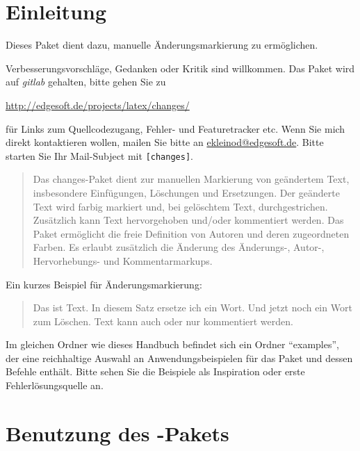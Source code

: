 \section{Einleitung}

Dieses Paket dient dazu, manuelle Änderungsmarkierung zu ermöglichen.

Verbesserungsvorschläge, Gedanken oder Kritik sind willkommen.
Das Paket wird auf \emph{gitlab} gehalten, bitte gehen Sie zu

\url{http://edgesoft.de/projects/latex/changes/}

für Links zum Quellcodezugang, Fehler- und Featuretracker etc.
Wenn Sie mich direkt kontaktieren wollen, mailen Sie bitte an \href{mailto:ekleinod@edgesoft.de}{ekleinod@edgesoft.de}.
Bitte starten Sie Ihr Mail-Subject mit \texttt{[changes]}.

\begin{quote}
	Das changes-Paket dient zur manuellen Markierung von geändertem Text, insbesondere Einfügungen, Löschungen und Ersetzungen.
	Der geänderte Text wird farbig markiert und, bei gelöschtem Text, durchgestrichen.
	Zusätzlich kann Text hervorgehoben und/oder kommentiert werden.
	Das Paket ermöglicht die freie Definition von Autoren und deren zugeordneten Farben.
	Es erlaubt zusätzlich die Änderung des Änderungs-, Autor-, Hervorhebungs- und Kommentarmarkups.
\end{quote}

Ein kurzes Beispiel für Änderungsmarkierung:

\begin{quote}
	Das ist  Text.
	In diesem Satz ersetze ich ein  Wort.
	Und jetzt noch ein  Wort zum Löschen.
	Text kann auch  oder nur  kommentiert werden.
\end{quote}

Im gleichen Ordner wie dieses Handbuch befindet sich ein Ordner "`examples"', der eine reichhaltige Auswahl an Anwendungsbeispielen für das Paket und dessen Befehle enthält.
Bitte sehen Sie die Beispiele als Inspiration oder erste Fehlerlösungsquelle an.


\cleardoublepage
\section{Benutzung des -Pakets}
\label{sec:usage}

